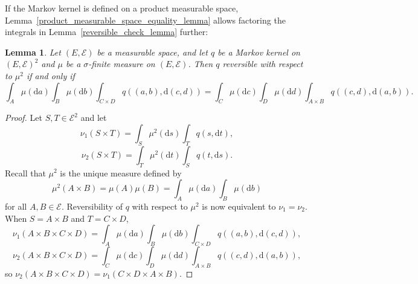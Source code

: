 \documentclass[english,twoside,openright]{HYgraduMLDS}
\newtheorem{lemma}{Lemma}[chapter]
\newcommand{\dx}{\mathrm{d}}
\begin{document}
If the Markov kernel is defined on a product measurable space,
Lemma~\ref{product_measurable_space_equality_lemma} allows factoring
the integrals in Lemma~\ref{reversible_check_lemma} further:
\begin{lemma}\label{reversible_check_product_lemma}
	Let \((E, \mathcal{E})\) be a measurable space, and let \(q\) be a Markov
  kernel on \((E, \mathcal{E})^{2}\) and \(\mu\) be a \(\sigma\)-finite measure
  on \((E, \mathcal{E})\).
  Then \(q\) reversible with respect to \(\mu^{2}\) if and only if
  \[
    \int_{A}\mu(\dx a)\int_{B}\mu(\dx b)\int_{C\times D}q((a, b), \dx(c, d))
    = \int_{C}\mu(\dx c)\int_{D}\mu(\dx d)\int_{A\times B}q((c, d), \dx(a, b)).
  \]
\end{lemma}
\begin{proof}
  Let \(S, T\in \mathcal{E}^{2}\) and let
  \[
    \nu_{1}(S\times T) = \int_{S}\mu^{2}(\dx s)\int_{T}q(s, \dx t),
  \]
  \[
    \nu_{2}(S\times T) = \int_{T}\mu^{2}(\dx t)\int_{S}q(t, \dx s).
  \]
  Recall that \(\mu^{2}\) is the unique measure defined by
  \[
    \mu^{2}(A\times B) = \mu(A)\mu(B) = \int_{A}\mu(\dx a)\int_{B}\mu(\dx b)
  \]
  for all \(A, B\in \mathcal{E}\). Reversibility of \(q\) with respect to
  \(\mu^{2}\) is now equivalent to \(\nu_{1} = \nu_{2}\).
  When \(S = A\times B\) and \(T = C\times D\),
  \[
    \nu_{1}(A\times B\times C\times D)
    = \int_{A}\mu(\dx a)\int_{B}\mu(\dx b)\int_{C\times D}q((a, b), \dx(c, d)),
  \]
  \[
    \nu_{2}(A\times B\times C\times D)
    = \int_{C}\mu(\dx c)\int_{D}\mu(\dx d)\int_{A\times B}q((c, d), \dx(a, b)),
  \]
  so \(\nu_{2}(A\times B\times C\times D) = \nu_{1}(C\times D\times A\times B)\).


\end{proof}
\end{document}
